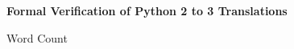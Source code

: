 \begin{titlepage}
    \begin{center}
        \vfill

        \Huge
        \textbf{Formal Verification of Python 2 to 3 Translations}

        \vspace*{0.5cm}

        \Large
        Word Count
    \end{center}
\end{titlepage}
